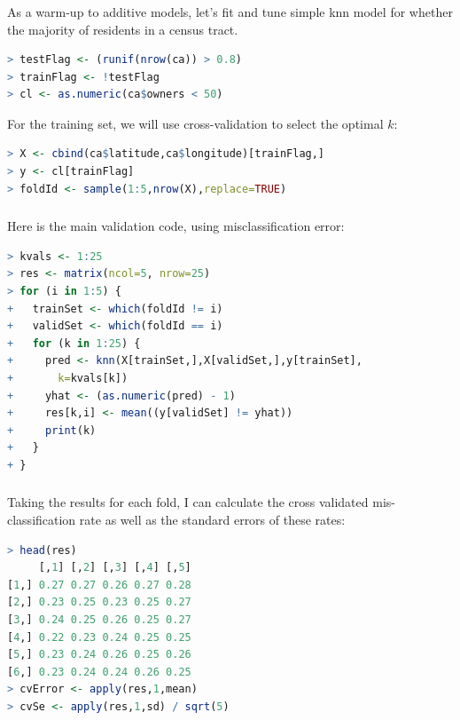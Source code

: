\documentclass[xetex,mathserif,serif,aspectratio=169]{beamer}
\begin{document}
\begin{frame}[fragile] \frametitle{} \oldB \small

As a warm-up to additive models, let's fit and tune simple
knn model for whether the majority of residents in a census tract.
\begin{lstlisting}[language=R, basicstyle=\fontsize{8pt}{10pt}\selectfont\ttfamily]
> testFlag <- (runif(nrow(ca)) > 0.8)
> trainFlag <- !testFlag
> cl <- as.numeric(ca$owners < 50)
\end{lstlisting}
For the training set, we will use cross-validation to select
the optimal $k$:
\begin{lstlisting}[language=R, basicstyle=\fontsize{8pt}{10pt}\selectfont\ttfamily]
> X <- cbind(ca$latitude,ca$longitude)[trainFlag,]
> y <- cl[trainFlag]
> foldId <- sample(1:5,nrow(X),replace=TRUE)
\end{lstlisting}

\end{frame}

\begin{frame}[fragile] \frametitle{} \oldB \small

Here is the main validation code, using misclassification
error:
\begin{lstlisting}[language=R, basicstyle=\fontsize{8pt}{10pt}\selectfont\ttfamily]
> kvals <- 1:25
> res <- matrix(ncol=5, nrow=25)
> for (i in 1:5) {
+   trainSet <- which(foldId != i)
+   validSet <- which(foldId == i)
+   for (k in 1:25) {
+     pred <- knn(X[trainSet,],X[validSet,],y[trainSet],
+       k=kvals[k])
+     yhat <- (as.numeric(pred) - 1)
+     res[k,i] <- mean((y[validSet] != yhat))
+     print(k)
+   }
+ }
\end{lstlisting}

\end{frame}

\begin{frame}[fragile] \frametitle{} \oldB \small

Taking the results for each fold, I can calculate the
cross validated mis-classification rate as well as the
standard errors of these rates:
\begin{lstlisting}[language=R, basicstyle=\fontsize{8pt}{10pt}\selectfont\ttfamily]
> head(res)
     [,1] [,2] [,3] [,4] [,5]
[1,] 0.27 0.27 0.26 0.27 0.28
[2,] 0.23 0.25 0.23 0.25 0.27
[3,] 0.24 0.25 0.26 0.25 0.27
[4,] 0.22 0.23 0.24 0.25 0.25
[5,] 0.23 0.24 0.26 0.25 0.26
[6,] 0.23 0.24 0.24 0.26 0.25
> cvError <- apply(res,1,mean)
> cvSe <- apply(res,1,sd) / sqrt(5)
\end{lstlisting}

\end{frame}
\end{document}
